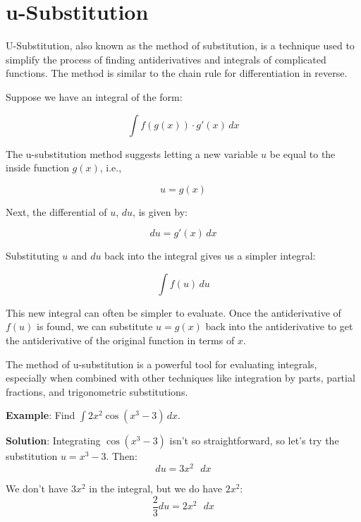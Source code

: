 \chapter{u-Substitution}


U-Substitution, also known as the method of substitution, is a technique used 
to simplify the process of finding antiderivatives and integrals of 
complicated functions. The method is similar to the chain rule for 
differentiation in reverse.

Suppose we have an integral of the form:

\begin{equation}
\int f(g(x)) \cdot g'(x) \, dx
\end{equation}

The u-substitution method suggests letting a new variable $u$ be equal to the inside function $g(x)$, i.e., 

\begin{equation}
u = g(x)
\end{equation}

Next, the differential of $u$, $du$, is given by:

\begin{equation}
du = g'(x) \, dx
\end{equation}

Substituting $u$ and $du$ back into the integral gives us a simpler integral:

\begin{equation}
\int f(u) \, du
\end{equation}

This new integral can often be simpler to evaluate. Once the antiderivative of 
$f(u)$ is found, we can substitute $u=g(x)$ back into the antiderivative to 
get the antiderivative of the original function in terms of $x$.

The method of u-substitution is a powerful tool for evaluating integrals, 
especially when combined with other techniques like integration by parts, 
partial fractions, and trigonometric substitutions.

\textbf{Example}: Find $\int 2 x^2 \cos{ \left( x^3 - 3 \right)}\,dx$.

\textbf{Solution}: Integrating $\cos{ \left( x^3 - 3 \right)}$ isn't so 
straightforward, so let's try the substitution $u = x^3 - 3$. Then:
$$du = 3 x^2 \text{ }dx$$

We don't have $3 x^2$ in the integral, but we do have $2 x^2$:
$$\frac{2}{3} du = 2 x^2 \text{ } dx$$

